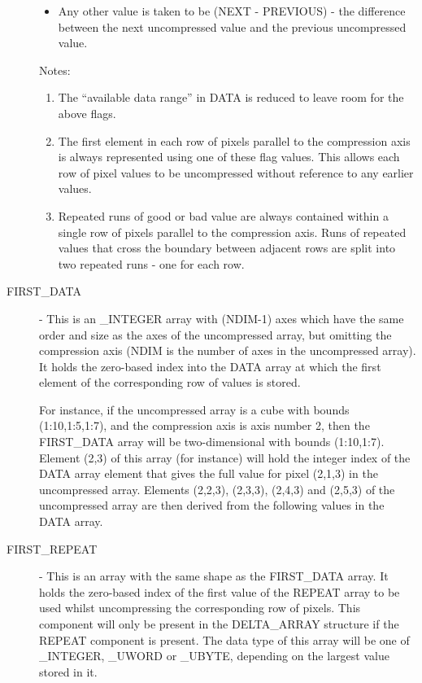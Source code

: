 \documentclass[twoside,11pt]{article}
\begin{document}
\begin{description}
\begin{itemize}
\item Any other value is taken to be (NEXT - PREVIOUS) - the difference
between the next uncompressed value and the previous uncompressed value.

\end{itemize}

Notes:

\begin{enumerate}

\item The ``available data range'' in DATA is reduced to leave room for the
above flags.

\item The first element in each row of pixels parallel to the compression
axis is always represented using one of these flag values. This allows
each row of pixel values to be uncompressed without reference to any
earlier values.

\item Repeated runs of good or bad value are always contained within a single
row of pixels parallel to the compression axis. Runs of repeated values
that cross the boundary between adjacent rows are split into two repeated
runs - one for each row.

\end{enumerate}

\item[FIRST\_DATA] - This is an \_INTEGER array with (NDIM-1) axes which
have the same order and size as the axes of the uncompressed array, but
omitting the compression axis (NDIM is the number of axes in the
uncompressed array). It holds the zero-based index into the DATA array at
which the first element of the corresponding row of values is stored.

For instance, if the uncompressed array is a cube with bounds
(1:10,1:5,1:7), and the compression axis is axis number 2, then the
FIRST\_DATA array will be two-dimensional with bounds (1:10,1:7). Element
(2,3) of this array (for instance) will hold the integer index of the
DATA array element that gives the full value for pixel (2,1,3) in the
uncompressed array. Elements (2,2,3), (2,3,3), (2,4,3) and (2,5,3) of the
uncompressed array are then derived from the following values in the DATA
array.

\item[FIRST\_REPEAT] - This is an array with the same shape as
the FIRST\_DATA array. It holds the zero-based index of the first value
of the REPEAT array to be used whilst uncompressing the corresponding
row of pixels. This component will only be present in the DELTA\_ARRAY
structure if the REPEAT component is present. The data type of this array
will be one of \_INTEGER, \_UWORD or \_UBYTE, depending on the largest value
stored in it.


\end{description}
\end{document}
